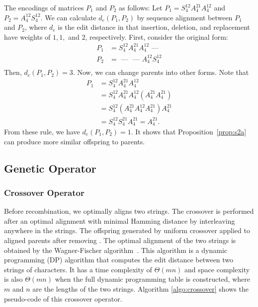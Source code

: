The encodings of matrices $ P_1 $ and $ P_2 $ as follows:
Let $ P_1 = S_4^{12} A_4^{21} A_4^{12} $ and $ P_2 =A_4^{12} S_4^{12} $.
We can calculate $ d_e(P_1, P_2) $ by sequence alignment between $ P_1 $ and $ P_2 $, where $ d_e $ is the edit distance in that insertion, deletion, and replacement have weights of $ 1,1, $ and $ 2 $, respectively.
First, consider the original form:
\begin{align*}
    P_1 &=    S_4^{12}       A_4^{21}        A_4^{12}  \,\, \text{---}\,\, \\
    P_2 &= \,\, \text{---}\,\, \,\,\text{---} \,\, A_4^{12} S_4^{12} \\
\end{align*}
Then, $ d_e \left( P_1, P_2 \right) = 3 $.
Now, we can change parents into other forms.
Note that
\begin{align*}
P_1 &= S_4^{12} A_4^{21} A_4^{12} \\
&= S_4^{12} A_4^{21} A_4^{12} \left( A_4^{21} A_4^{21} \right) \\
&= S_4^{12} \left( A_4^{21} A_4^{12} A_4^{21} \right) A_4^{21} \\
&= S_4^{12} S_4^{21} A_4^{21} = A_4^{21}.
\end{align*}
From these rule, we have $ d_e(P_1, P_2) = 1 $.
It shows that Proposition~\ref{prop:s2a} can produce more similar offspring to parents.



\subsection{Genetic Operator} \label{section:genetic_operator}

\subsubsection{Crossover Operator}
Before recombination, we optimally aligns two strings.
The crossover is performed after an optimal alignment with minimal Hamming distance by interleaving  anywhere in the strings.
The offspring generated by uniform crossover applied to aligned parents after removing .  
The optimal alignment of the two strings is obtained by the Wagner-Fischer algorithm~\cite{wagner1974string}.
This algorithm is a dynamic programming (DP) algorithm that computes the edit distance between two strings of characters. 
It has a time complexity of $ \Theta(mn) $ and space complexity is also $ \Theta(mn) $ when the full dynamic programming table is constructed, where $m $ and $ n $ are the lengths of the two strings.
Algorithm \ref{algo:crossover} shows the pseudo-code of this crossover operator.

